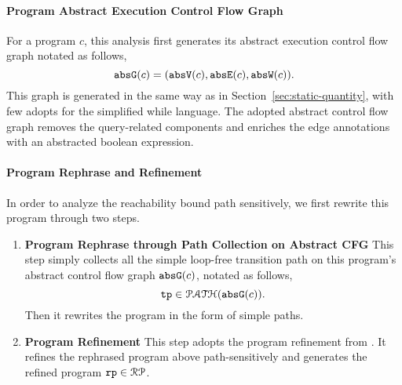 \paragraph{Program Abstract Execution Control Flow Graph}
For a program $c$, this analysis first generates its abstract execution control flow graph notated as follows,
\[\mathtt{abs}{\mathtt{G}}(c) =(\mathtt{abs}{\mathtt{V}}(c), \mathtt{abs}{\mathtt{E}}(c), \mathtt{abs}{\mathtt{W}}(c)).\]
This graph is generated in the same way as in Section~\ref{sec:static-quantity}, with few adopts for the simplified while language.
The adopted abstract control flow graph removes the query-related components and
enriches the edge annotations with an abstracted boolean expression.
\paragraph{Program Rephrase and Refinement}
In order to analyze the reachability bound path sensitively, we first rewrite this program through two steps.
\\
\begin{enumerate}
\item \textbf{ Program Rephrase through Path Collection on Abstract CFG}
This step simply collects all the simple loop-free transition path
on this program's abstract control flow graph $\mathtt{abs}{\mathtt{G}}(c)$, notated as follows,
\[ \mathtt{tp} \in \mathcal{PATH}(\mathtt{abs}{\mathtt{G}}(c)). \]
Then it rewrites the program in the form of simple paths.
\item \textbf{ Program Refinement} This step adopts the program refinement from \cite{GulwaniJK09}.
It refines the rephrased program above path-sensitively and generates the refined program 
$\mathtt{rp} \in \mathcal{RP}$.
\end{enumerate}
